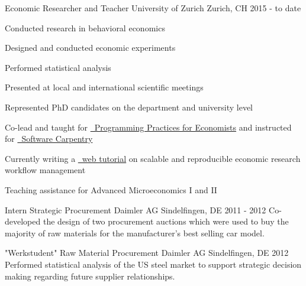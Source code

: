 
\begin{section}[Experience]

  \entry%
  {Economic Researcher and Teacher} %
  {University of Zurich} %
  {Zurich, CH} %
  {2015 - to date} %
  {%
    \begin{entrylist}
      \item Conducted research in behavioral economics
      \item Designed and conducted economic experiments
      \item Performed statistical analysis
      \item Presented at local and international scientific meetings
      \item Represented PhD candidates on the department and university level
      \item Co-lead and taught for \href{https://pp4rs.github.io/}{\faExternalLink \ Programming Practices for Economists} and instructed for \href{https://uzhcrs.github.io/2019-02-07-zurich/}{\faExternalLink \ Software Carpentry}
      \item Currently writing a \href{https://lachlandeer.github.io/snakemake-econ-r-tutorial/}{\faExternalLink \ web tutorial} on scalable and reproducible economic research workflow management
      \item Teaching assistance for Advanced Microeconomics I and II
    \end{entrylist}
  }%

  \entry%
    {Intern Strategic Procurement} %
    {Daimler AG} %
    {Sindelfingen, DE} %
    {2011 - 2012} %
    {%
     Co-developed the design of two procurement auctions which were used to buy the majority of raw materials for the manufacturer's best selling car model.
    }%

    \entry%
    {"Werkstudent" Raw Material Procurement} %
    {Daimler AG} %
    {Sindelfingen, DE} %
    {2012} %
    {%
    Performed statistical analysis of the US steel market to support strategic decision making regarding future supplier relationships.
    }%
\end{section}

